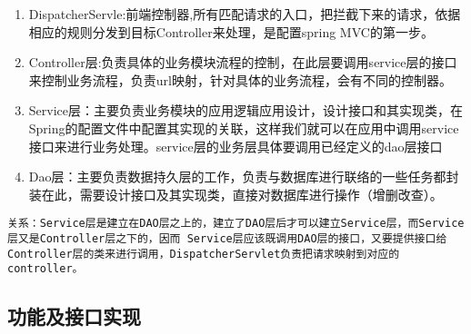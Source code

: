 \begin{enumerate}
\item DispatcherServle:前端控制器,所有匹配请求的入口，把拦截下来的请求，依据相应的规则分发到目标Controller来处理，是配置spring MVC的第一步。
\item Controller层:负责具体的业务模块流程的控制，在此层要调用service层的接口来控制业务流程，负责url映射，针对具体的业务流程，会有不同的控制器。
\item Service层：主要负责业务模块的应用逻辑应用设计，设计接口和其实现类，在Spring的配置文件中配置其实现的关联，这样我们就可以在应用中调用service接口来进行业务处理。service层的业务层具体要调用已经定义的dao层接口
\item Dao层：主要负责数据持久层的工作，负责与数据库进行联络的一些任务都封装在此，需要设计接口及其实现类，直接对数据库进行操作（增删改查）。
\end{enumerate}

\begin{verbatim}
关系：Service层是建立在DAO层之上的，建立了DAO层后才可以建立Service层，而Service层又是Controller层之下的，因而 Service层应该既调用DAO层的接口，又要提供接口给Controller层的类来进行调用，DispatcherServlet负责把请求映射到对应的controller。
\end{verbatim}



\subsection{功能及接口实现}

